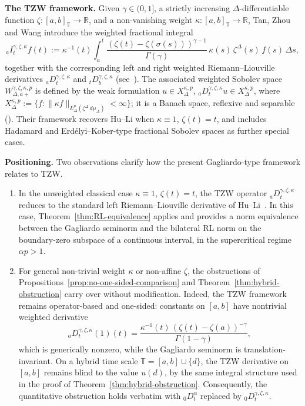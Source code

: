 \documentclass[11pt,a4paper]{article}
\numberwithin{equation}{section}
\theoremstyle{definition}
\newcommand{\R}{\mathbb{R}}
\newcommand{\T}{\mathbb{T}}
\begin{document}
\textbf{The TZW framework.} Given $\gamma \in (0,1]$, a strictly
increasing $\Delta$-differentiable function
$\zeta : [a,b]_\T \to \R$, and a non-vanishing weight
$\kappa : [a,b]_\T \to \R$, Tan, Zhou and Wang introduce the
weighted fractional integral
\[
{}_a I_t^{\gamma,\zeta,\kappa} f(t)
:= \kappa^{-1}(t) \int_a^t
   \frac{(\zeta(t)-\zeta(\sigma(s)))^{\gamma-1}}{\Gamma(\gamma)}\,
   \kappa(s)\, \zeta^\Delta(s)\, f(s)\, \Delta s,
\]
together with the corresponding left and right weighted Riemann--Liouville
derivatives ${}_a D_t^{\gamma,\zeta,\kappa}$ and
${}_t D_b^{\gamma,\zeta,\kappa}$ (see~\cite[Definitions~5--6]{TanZhouWang2025}).
The associated weighted Sobolev space
$W^{\gamma,\zeta,\kappa,p}_{\Delta,a+}$ is defined by the weak
formulation $u \in X^{\kappa,p}_\Delta$,
${}_a D_t^{\gamma,\zeta,\kappa} u \in X^{\kappa,p}_\Delta$, where
$X^{\kappa,p}_\Delta := \{ f : \|\kappa f\|_{L^p_\Delta(\zeta^\Delta\, d\mu_\Delta)} < \infty\}$;
it is a Banach space, reflexive and separable
(\cite[Theorems~14--16]{TanZhouWang2025}). Their framework recovers
Hu--Li when $\kappa \equiv 1$, $\zeta(t) = t$, and includes Hadamard
and Erdélyi--Kober-type fractional Sobolev spaces as further special
cases.

\medskip

\textbf{Positioning.} Two observations clarify how the present
Gagliardo-type framework relates to TZW.

\begin{enumerate}
\item[(i)] In the unweighted classical case
$\kappa \equiv 1$, $\zeta(t) = t$, the TZW operator
${}_a D_t^{\gamma,\zeta,\kappa}$ reduces to the standard left
Riemann--Liouville derivative of Hu--Li~\cite{HuLi2022Right,HuLi2022Left}.
In this case, Theorem~\ref{thm:RL-equivalence} applies and provides a
norm equivalence between the Gagliardo seminorm and the bilateral
RL norm on the boundary-zero subspace of a continuous interval, in
the supercritical regime $\alpha p > 1$.

\item[(ii)] For general non-trivial weight $\kappa$ or
non-affine $\zeta$, the obstructions of
Propositions~\ref{prop:no-one-sided-comparison}
and Theorem~\ref{thm:hybrid-obstruction} carry over without
modification. Indeed, the TZW framework remains operator-based and
one-sided: constants on $[a,b]$ have nontrivial weighted derivative
\[
{}_a D_t^{\gamma,\zeta,\kappa}(1)(t)
= \frac{\kappa^{-1}(t)\,(\zeta(t)-\zeta(a))^{-\gamma}}{\Gamma(1-\gamma)},
\]
which is generically nonzero, while the Gagliardo seminorm is
translation-invariant. On a hybrid time scale
$\T = [a,b] \cup \{d\}$, the TZW derivative on $[a,b]$ remains blind
to the value $u(d)$, by the same integral structure used in the
proof of Theorem~\ref{thm:hybrid-obstruction}. Consequently, the
quantitative obstruction holds verbatim with
${}_0 D_t^\alpha$ replaced by
${}_0 D_t^{\gamma,\zeta,\kappa}$.
\end{enumerate}
\end{document}
